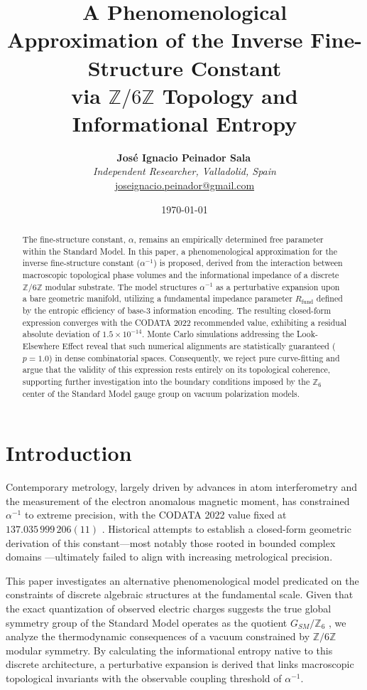 \documentclass[12pt,a4paper]{article}
\title{\textbf{A Phenomenological Approximation of the Inverse Fine-Structure Constant}\\ \large via $\mathbb{Z}/6\mathbb{Z}$ Topology and Informational Entropy}
\author{
  \textbf{José Ignacio Peinador Sala}\,\orcidlink{0009-0008-1822-3452} \\
  \textit{Independent Researcher, Valladolid, Spain} \\
  \small\href{mailto:joseignacio.peinador@gmail.com}{joseignacio.peinador@gmail.com}
}
\date{\today}
\begin{document}
\maketitle


\begin{abstract}
The fine-structure constant, $\alpha$, remains an empirically determined free parameter within the Standard Model. In this paper, a phenomenological approximation for the inverse fine-structure constant ($\alpha^{-1}$) is proposed, derived from the interaction between macroscopic topological phase volumes and the informational impedance of a discrete $\mathbb{Z}/6\mathbb{Z}$ modular substrate. The model structures $\alpha^{-1}$ as a perturbative expansion upon a bare geometric manifold, utilizing a fundamental impedance parameter $R_{\text{fund}}$ defined by the entropic efficiency of base-3 information encoding. The resulting closed-form expression converges with the CODATA 2022 recommended value, exhibiting a residual absolute deviation of $1.5 \times 10^{-14}$. Monte Carlo simulations addressing the Look-Elsewhere Effect reveal that such numerical alignments are statistically guaranteed ($p=1.0$) in dense combinatorial spaces. Consequently, we reject pure curve-fitting and argue that the validity of this expression rests entirely on its topological coherence, supporting further investigation into the boundary conditions imposed by the $\mathbb{Z}_6$ center of the Standard Model gauge group on vacuum polarization models.
\end{abstract}


\section{Introduction}

Contemporary metrology, largely driven by advances in atom interferometry and the measurement of the electron anomalous magnetic moment, has constrained $\alpha^{-1}$ to extreme precision, with the CODATA 2022 value fixed at $137.035\,999\,206(11)$ \cite{codata2022}. Historical attempts to establish a closed-form geometric derivation of this constant—most notably those rooted in bounded complex domains \cite{wyler1971}—ultimately failed to align with increasing metrological precision.

This paper investigates an alternative phenomenological model predicated on the constraints of discrete algebraic structures at the fundamental scale. Given that the exact quantization of observed electric charges suggests the true global symmetry group of the Standard Model operates as the quotient $G_{SM} / \mathbb{Z}_6$ \cite{aharony2013}, we analyze the thermodynamic consequences of a vacuum constrained by $\mathbb{Z}/6\mathbb{Z}$ modular symmetry. By calculating the informational entropy native to this discrete architecture, a perturbative expansion is derived that links macroscopic topological invariants with the observable coupling threshold of $\alpha^{-1}$.
\end{document}
